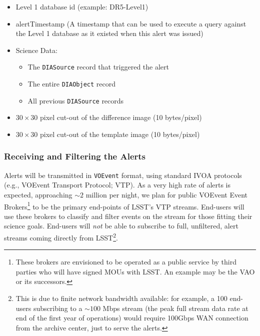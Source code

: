 \documentclass[12pt]{article}
\newcommand{\code}[1]{\texttt{#1}}
\newcommand{\DIASource}{\code{DIASource}\xspace}
\newcommand{\DIAObject}{\code{DIAObject}\xspace}
\newcommand{\DB}{{Level 1 database}\xspace}
\newcommand{\VOEvent}{\code{VOEvent}\xspace}
\begin{document}
\begin{itemize}
\item \DB id (example: DR5-Level1)
\item alertTimestamp (A timestamp that can be used to execute a query against the \DB as it existed when this alert was issued)
\item Science Data:
    \begin{itemize}
    \item The \DIASource record that triggered the alert
    \item The entire \DIAObject record
    \item All previous \DIASource records
    \end{itemize}
\item $30\times 30$ pixel cut-out of the difference image (10 bytes/pixel)
\item $30\times 30$ pixel cut-out of the template image (10 bytes/pixel)
\end{itemize}

\subsubsection{Receiving and Filtering the Alerts}
\label{sec:eventbrokers}

Alerts will be transmitted in \VOEvent format, using standard IVOA protocols (e.g., VOEvent Transport Protocol; VTP). As a very high rate of alerts is expected, approaching $\sim 2$ million per night, we plan for public VOEvent Event Brokers\footnote{These brokers are envisioned to be operated as a public service by third parties who will have signed MOUs with LSST. An example may be the VAO or its successors.} to be the primary end-points of LSST's VTP streams. End-users will use these brokers to classify and filter events on the stream for those fitting their science goals. End-users will {\em not} be able to subscribe to full, unfiltered, alert streams coming directly from LSST\footnote{This is due to finite network bandwidth available: for example, a 100 end-users subscribing to a $\sim 100$ Mbps stream (the peak full stream data rate at end of the first year of operations) would require 100Gbps WAN connection from the archive center, just to serve the alerts.}.
\end{document}
